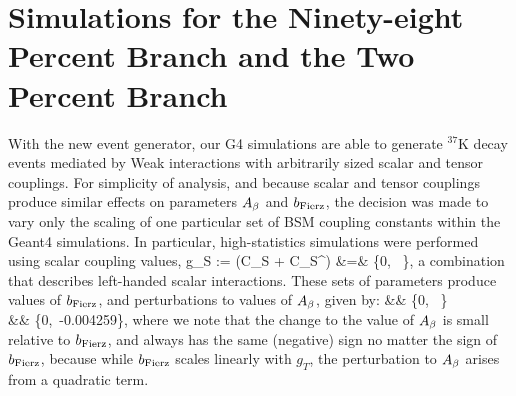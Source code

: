 
\section{Simulations for the Ninety-eight Percent Branch and the Two Percent Branch}
\label{sec:TwoP}
With the new event generator, our G4 simulations are able to generate $^{37}$K decay events mediated by Weak interactions with arbitrarily sized scalar and tensor couplings.  For simplicity of analysis, and because scalar and tensor couplings produce similar effects on parameters $A_{\beta}$ and $b_{\mathrm{Fierz}}$, the decision was made to vary only the scaling of one particular set of BSM coupling constants within the Geant4 simulations. In particular, high-statistics simulations were performed using scalar coupling values,
\bea
g_S := (C_S + C_S^\prime) &=& \{0, \, \}, 
\eea
a combination that describes left-handed scalar interactions.  These sets of parameters produce values of
$b_{\mathrm{Fierz}}$, and perturbations to values of $A_{\beta}$, given by:
\bea
\bFierz &\approx& \{0, \, \}  \\
\Delta \Abeta &\approx& \{0,\, -0.004259\}, 
\eea
where we note that the change to the value of $A_{\beta}$ is small relative to $b_{\mathrm{Fierz}}$, and always has the same (negative) sign no matter the sign of $b_{\mathrm{Fierz}}$, because while $b_{\mathrm{Fierz}}$ scales linearly with $g_T$, the perturbation to $A_{\beta}$ arises from a quadratic term.


